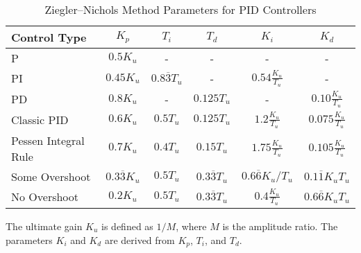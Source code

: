\begin{table}[ht]
    \centering
    \caption{Ziegler--Nichols Method Parameters for PID Controllers}
    \label{tab:ziegler-nichols}
    \begin{tabular}{|l|c|c|c|c|c|}
        \hline
        Control Type         & \( K_p \)                  & \( T_i \)                  & \( T_d \)                   & \( K_i \)                      & \( K_d \)                      \\
        \hline
        P                    & \( 0.5 K_u \)              & -                          & -                           & -                              & -                              \\
        PI                   & \( 0.45 K_u \)             & \( 0.8 \overline{3} T_u \) & -                           & \( 0.54 \frac{K_u}{T_u} \)     & -                              \\
        PD                   & \( 0.8 K_u \)              & -                          & \( 0.125 T_u \)             & -                              & \( 0.10 \frac{K_u}{T_u} \)     \\
        Classic PID          & \( 0.6 K_u \)              & \( 0.5 T_u \)              & \( 0.125 T_u \)             & \( 1.2 \frac{K_u}{T_u} \)      & \( 0.075 \frac{K_u}{T_u} \)    \\
        Pessen Integral Rule & \( 0.7 K_u \)              & \( 0.4 T_u \)              & \( 0.15 T_u \)              & \( 1.75 \frac{K_u}{T_u} \)     & \( 0.105 \frac{K_u}{T_u} \)    \\
        Some Overshoot       & \( 0.3 \overline{3} K_u \) & \( 0.5 T_u \)              & \( 0.3 \overline{3}{T_u} \) & \( 0.6 \overline{6} K_u/T_u \) & \( 0.1 \overline{1} K_u T_u \) \\
        No Overshoot         & \( 0.2 K_u \)              & \( 0.5 T_u \)              & \( 0.3 \overline{3}{T_u} \) & \( 0.4 \frac{K_u}{T_u} \)      & \( 0.6 \overline{6} K_u T_u \) \\
        \hline
    \end{tabular}
\end{table}

The ultimate gain \( K_u \) is defined as \( 1/M \), where \( M \) is the
amplitude ratio. The parameters \( K_i \) and \( K_d \) are derived from \( K_p
\), \( T_i \), and \( T_d \).